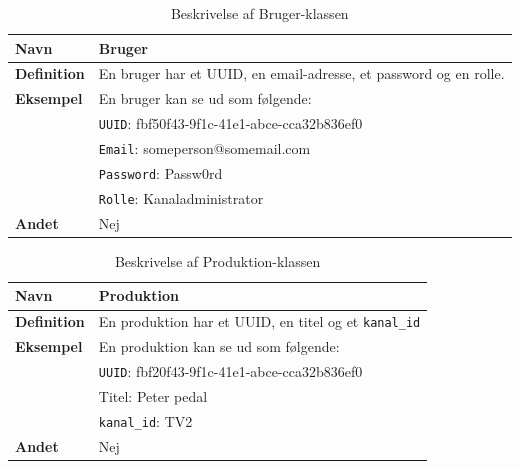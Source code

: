 \begin{table}[H]
    \begin{tabularx}{\textwidth}{|p{3cm}|X|}
        \hline
        \textbf{Navn} & Bruger\\
        \hline
        \textbf{Definition} &  En bruger har et UUID, en email-adresse, et password og en rolle. \\
        \hline
        \textbf{Eksempel} & En bruger kan se ud som følgende: \\
                          & \texttt{UUID}: fbf50f43-9f1c-41e1-abce-cca32b836ef0 \\
                          & \texttt{Email}: someperson@somemail.com\\
                          & \texttt{Password}: Passw0rd\\
                          & \texttt{Rolle}: Kanaladministrator \\
        \hline
        \textbf{Andet} & Nej\\
        \hline
    \end{tabularx}
    \caption{Beskrivelse af Bruger-klassen}
    \label{tab:user_class_description}
\end{table}

\begin{table}[H]
    \begin{tabularx}{\textwidth}{|p{3cm}|X|}
        \hline
        \textbf{Navn} & Produktion\\
        \hline
        \textbf{Definition} &  En produktion har et UUID, en titel og et \texttt{kanal\_id}\\
        \hline
        \textbf{Eksempel} & En produktion kan se ud som følgende:\\
                          & \texttt{UUID}: fbf20f43-9f1c-41e1-abce-cca32b836ef0 \\
                          & Titel: Peter pedal \\
                          & \texttt{kanal\_id}: TV2 \\
        \hline
        \textbf{Andet} & Nej\\
        \hline
    \end{tabularx}
    \caption{Beskrivelse af Produktion-klassen}
    \label{tab:production_class_description}
\end{table}

